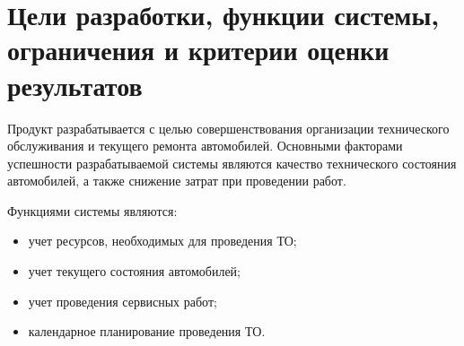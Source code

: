 \documentclass[../nirs.tex]{subfiles}
\begin{document}
\section{Цели разработки, функции системы, ограничения и критерии оценки
результатов}

Продукт разрабатывается с целью совершенствования организации технического
обслуживания и текущего ремонта автомобилей. Основными факторами успешности
разрабатываемой системы являются качество технического состояния автомобилей, а
также снижение затрат при проведении работ.

Функциями системы являются:
\begin{itemize}
	\item учет ресурсов, необходимых для проведения ТО;
	\item учет текущего состояния автомобилей;
	\item учет проведения сервисных работ;
	\item календарное планирование проведения ТО.
\end{itemize}
\end{document}

